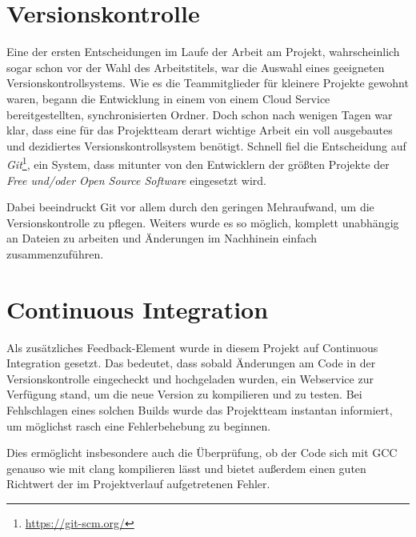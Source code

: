 \section{Versionskontrolle}
Eine der ersten Entscheidungen im Laufe der Arbeit am Projekt, wahrscheinlich sogar schon vor der Wahl des Arbeitstitels, war die Auswahl eines geeigneten Versionskontrollsystems. Wie es die Teammitglieder für kleinere Projekte gewohnt waren, begann die Entwicklung in einem von einem Cloud Service bereitgestellten, synchronisierten Ordner. Doch schon nach wenigen Tagen war klar, dass eine für das Projektteam derart wichtige Arbeit ein voll ausgebautes und dezidiertes Versionskontrollsystem benötigt. Schnell fiel die Entscheidung auf \textit{Git}\footnote{\url{https://git-scm.org/}}, ein System, dass mitunter von den Entwicklern der größten Projekte der \textit{Free und/oder Open Source Software} eingesetzt wird.

Dabei beeindruckt Git vor allem durch den geringen Mehraufwand, um die Versionskontrolle zu pflegen. Weiters wurde es so möglich, komplett unabhängig an Dateien zu arbeiten und Änderungen im Nachhinein einfach zusammenzuführen.

\section{Continuous Integration}
Als zusätzliches Feedback-Element wurde in diesem Projekt auf Continuous Integration ge\-setzt. Das bedeutet, dass sobald Änderungen am Code in der Versionskontrolle eingecheckt und hochgeladen wurden, ein Webservice zur Verfügung stand, um die neue Version zu kompilieren und zu testen. Bei Fehlschlagen eines solchen Builds wurde das Projektteam instantan informiert, um möglichst rasch eine Fehlerbehebung zu beginnen.

Dies ermöglicht insbesondere auch die Überprüfung, ob der Code sich mit GCC genauso wie mit clang kompilieren lässt und bietet außerdem einen guten Richtwert der im Projektverlauf aufgetretenen Fehler. 
